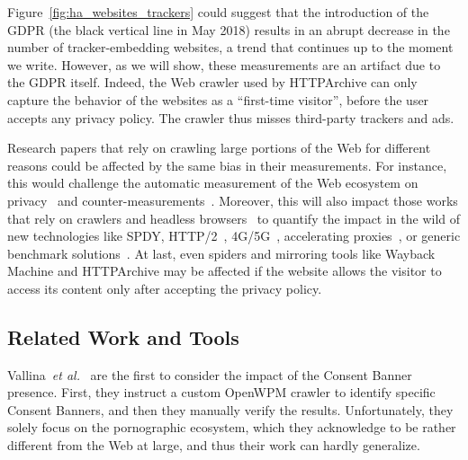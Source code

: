 Figure~\ref{fig:ha_websites_trackers} could suggest that the introduction of the GDPR (the black vertical line in May 2018) results in an abrupt decrease in the number of tracker-embedding websites, a trend that continues up to the moment we write. However, as we will show, these measurements are an artifact due to the GDPR itself. Indeed, the Web crawler used by HTTPArchive can only capture the behavior of the websites as a ``first-time visitor'', before the user accepts any privacy policy. The crawler thus misses third-party trackers and ads.

Research papers that rely on crawling large portions of the Web for different reasons could be affected by the same bias in their measurements. For instance, this would challenge the automatic measurement of the Web ecosystem on privacy~\cite{acar2014web,falahrastegar2014rise,metwalley2015online,pujol2015annoyed,englehardt2016online,iordanou2018tracing,hu2019characterising,rizzo2021unveiling,vandrevu2019what,papadogiannakis2021,aqeel2020on} and counter-measurements~\cite{pujol2015annoyed, traverso2017benchmark, mazel2019comparison}. Moreover, this will also impact those works that rely on crawlers and headless browsers~\cite{avasarala2014selenium} to quantify the impact in the wild of new technologies like SPDY,  HTTP/2~\cite{wang2014speedy,de2015http,bocchi2016measuring,erman2015towards}, 4G/5G~\cite{alay2017experience,asrese2019measuring}, accelerating proxies~\cite{sivakumar2014parcel,wang2016speeding,ruamviboonsuk2017vroom}, or generic benchmark solutions~\cite{netravali2015mahimahi}. At last, even spiders and mirroring tools like Wayback Machine and HTTPArchive may be affected if the website allows the visitor to access its content only after accepting the privacy policy.

\subsection{Related Work and Tools}
\label{sec:related}
Vallina~\emph{et al.}~\cite{vallina2019tales} are the first to consider the impact of the Consent Banner presence. First, they instruct a custom OpenWPM crawler to identify specific Consent Banners, and then they manually verify the results. Unfortunately, they solely focus on the pornographic ecosystem, which they acknowledge to be rather different from the Web at large, and thus their work can hardly generalize.

